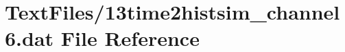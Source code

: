 \hypertarget{13time2histsim__channel6_8dat}{}\section{Text\+Files/13time2histsim\+\_\+channel6.dat File Reference}
\label{13time2histsim__channel6_8dat}
